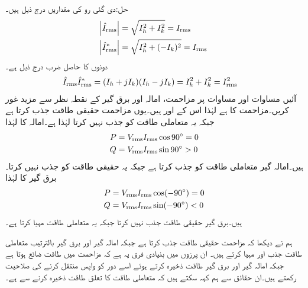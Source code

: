 حل:دی گئی رو کی مقداریں درج ذیل ہیں۔
\begin{align*}
\abs{{\hat{I}_{\textup{rms}}}}&=\sqrt{I_h^2+I_k^2}={I_{\textup{rms}}}\\
\abs{{\hat{I}^{*}_{\textup{rms}}}}&=\sqrt{I_h^2+(-I_k)^2}={I_{\textup{rms}}}
\end{align*}
دونوں  کا حاصل ضرب درج ذیل ہے۔
\begin{align}\label{مساوات_طاقت_مقدار_مساوی_مخلوط_اور_جوڑی_دور_ضرب}
{\ensuremath{\hat{I}_{\textup{rms}}}}{\ensuremath{\hat{I}^{*}_{\textup{rms}}}}&=(I_h+jI_k)(I_h-jI_k)=I_h^2+I_k^2={I^2_{\textup{rms}}}
\end{align}
آئیں مساوات  اور مساوات  پر مزاحمت، امالہ اور برق گیر کے نقطہ نظر سے مزید غور کریں۔مزاحمت کا  ہے لہٰذا اس کے  اور  ہیں۔یوں مزاحمت حقیقی طاقت جذب  کرتا ہے جبکہ یہ متعاملی طاقت کو جذب نہیں کرتا لہٰذا  ہے۔امالہ کا   لہٰذا
\begin{align}
P&={V_{\textup{rms}}} {I_{\textup{rms}}} \cos 90^{\circ}=0\\
Q&={V_{\textup{rms}}} {I_{\textup{rms}}} \sin 90^{\circ}>0
\end{align}
ہیں۔امالہ گیر متعاملی طاقت کو جذب کرتا ہے جبکہ یہ حقیقی طاقت کو جذب نہیں کرتا۔برق گیر کا  لہٰذا
\begin{align}
P&={V_{\textup{rms}}} {I_{\textup{rms}}} \cos (-90^{\circ})=0\\
Q&={V_{\textup{rms}}} {I_{\textup{rms}}} \sin (-90^{\circ})<0
\end{align}
ہیں۔برق گیر حقیقی طاقت جذب نہیں کرتا جبکہ یہ متعاملی طاقت مہیا کرتا ہے۔

ہم نے دیکھا کہ مزاحمت حقیقی طاقت جذب کرتا ہے جبکہ امالہ گیر اور برق گیر بالترتیب متعاملی طاقت جذب اور مہیا کرتے ہیں۔ ان پرزوں میں بنیادی فرق یہ ہے کہ مزاحمت میں طاقت ضائع ہوتا ہے جبکہ امالہ گیر اور برق گیر طاقت ذخیرہ کرتے ہوئے اسے دور کو واپس منتقل کرنے کی صلاحیت رکھتے ہیں۔ان حقائق سے ہم کہہ سکتے ہیں کہ متعاملی طاقت کا تعلق طاقت ذخیرہ کرنے سے  ہے۔  


